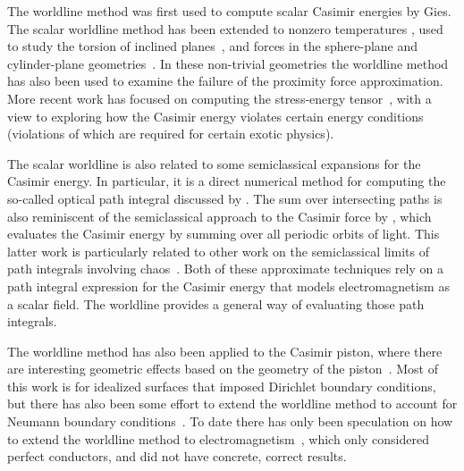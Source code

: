 The worldline method was first used to compute scalar Casimir energies by Gies\etal\citep{Gies2003,Gies2006, Gies2006a}.
The scalar worldline method has been extended to nonzero temperatures \citep{Klingmueller2008},
 used to study the torsion of inclined planes~\citep{Weber2009},
and forces in the sphere-plane and cylinder-plane geometries~\citep{Weber2010, Weber2010a}.  
In these non-trivial geometries the worldline method has also been used to examine the failure of the proximity force approximation.
More recent work has focused on computing the stress-energy tensor~\citep{Schafer2012, Schafer2016},
with a view to exploring how the Casimir energy violates certain energy conditions (violations of which are required for certain exotic physics).

The scalar worldline is also related to some semiclassical expansions for the Casimir energy.  
In particular, it is a direct numerical method for computing the so-called optical path integral
discussed by \citet{Scardicchio2005, Scardicchio2006}.  The sum over intersecting paths is also reminiscent 
of the semiclassical approach to the Casimir force by \citet{Schaden1998}, which evaluates 
the Casimir energy by summing over all periodic orbits of light.  This latter work is particularly 
related to other work on the semiclassical limits of path integrals involving chaos~\citep{Gutzwiller1990}.
Both of these approximate techniques rely on a path integral expression for the Casimir energy that models electromagnetism as a
scalar field. The worldline provides a general way of evaluating those path integrals.   

The worldline method has also been applied to the Casimir piston, where there are interesting geometric effects
based on the geometry of the piston~\citep{Schaden2009,Schaden2009a}.
Most of this work is for idealized surfaces that imposed Dirichlet boundary conditions, but 
there has also been some effort to extend the worldline method to account for Neumann boundary
conditions~\citep{Fosco2010}.  To date there has only been speculation on how to extend the 
worldline method to electromagnetism~\citep{Aehlig2011}, which only considered perfect conductors,
and did not have concrete, correct results.    


